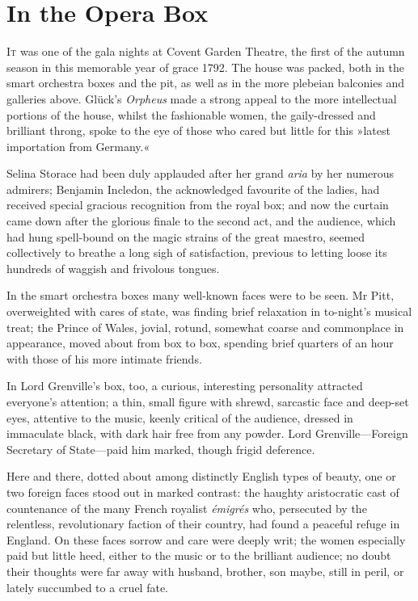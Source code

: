 
\chapter{In the Opera Box}
\lettrine[lines=4]{I}{t} was one of the gala nights at Covent Garden Theatre, the first of the autumn season in this memorable year of grace 1792. The house was packed, both in the smart orchestra boxes and the pit, as well as in the more plebeian balconies and galleries above. Glück's \textit{Orpheus} made a strong appeal to the more intellectual portions of the house, whilst the fashionable women, the gaily-dressed and brilliant throng, spoke to the eye of those who cared but little for this »latest importation from Germany.«

Selina Storace had been duly applauded after her grand \textit{aria} by her numerous admirers; Benjamin Incledon, the acknowledged favourite of the ladies, had received special gracious recognition from the royal box; and now the curtain came down after the glorious finale to the second act, and the audience, which had hung spell-bound on the magic strains of the great maestro, seemed collectively to breathe a long sigh of satisfaction, previous to letting loose its hundreds of waggish and frivolous tongues.

In the smart orchestra boxes many well-known faces were to be seen. Mr Pitt, overweighted with cares of state, was finding brief relaxation in to-night's musical treat; the Prince of Wales, jovial, rotund, somewhat coarse and commonplace in appearance, moved about from box to box, spending brief quarters of an hour with those of his more intimate friends.

In Lord Grenville's box, too, a curious, interesting personality attracted everyone's attention; a thin, small figure with shrewd, sarcastic face and deep-set eyes, attentive to the music, keenly critical of the audience, dressed in immaculate black, with dark hair free from any powder. Lord Grenville—Foreign Secretary of State—paid him marked, though frigid deference.

Here and there, dotted about among distinctly English types of beauty, one or two foreign faces stood out in marked contrast: the haughty aristocratic cast of countenance of the many French royalist \textit{émigrés} who, persecuted by the relentless, revolutionary faction of their country, had found a peaceful refuge in England. On these faces sorrow and care were deeply writ; the women especially paid but little heed, either to the music or to the brilliant audience; no doubt their thoughts were far away with husband, brother, son maybe, still in peril, or lately succumbed to a cruel fate.

